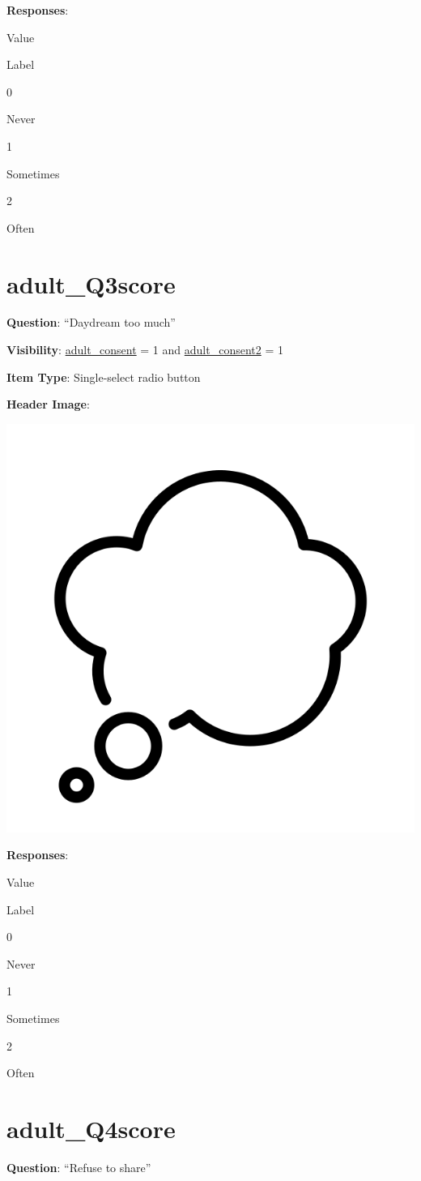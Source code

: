 \documentclass[]{book}
\begin{document}
\textbf{Responses}:

Value

Label

0

Never

1

Sometimes

2

Often

\hypertarget{adult_q3score}{%
\section{adult\_Q3score}\label{adult_q3score}}

\textbf{Question}: ``Daydream too much''

\textbf{Visibility}: \protect\hyperlink{adult_consent}{adult\_consent} = 1 and \protect\hyperlink{adult_consent2}{adult\_consent2} = 1

\textbf{Item Type}: Single-select radio button

\textbf{Header Image}:

\begin{flushleft}\includegraphics[width=0.33\linewidth]{downloadFigs4latex_HBN_PMHS_Codebook/adult_Q3score_headerImg} \end{flushleft}

\textbf{Responses}:

Value

Label

0

Never

1

Sometimes

2

Often

\hypertarget{adult_q4score}{%
\section{adult\_Q4score}\label{adult_q4score}}

\textbf{Question}: ``Refuse to share''
\end{document}
